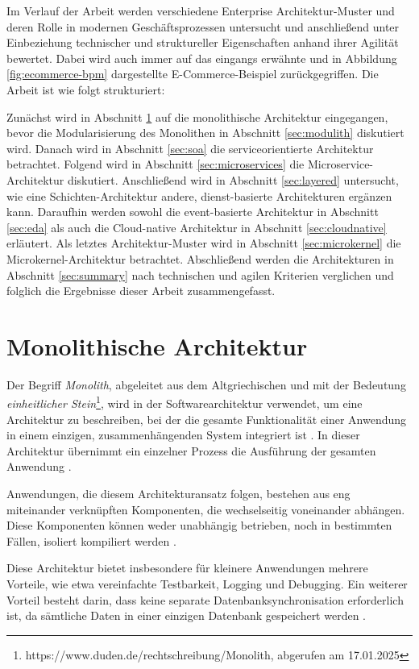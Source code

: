 \documentclass[acmtog]{acmart}
\begin{document}
Im Verlauf der Arbeit werden verschiedene Enterprise Architektur-Muster und deren Rolle in modernen Geschäftsprozessen untersucht
und anschließend unter Einbeziehung technischer und struktureller Eigenschaften anhand ihrer Agilität bewertet.
Dabei wird auch immer auf das eingangs erwähnte und in Abbildung \ref{fig:ecommerce-bpm} dargestellte E-Commerce-Beispiel zurückgegriffen.
Die Arbeit ist wie folgt strukturiert:

Zunächst wird in Abschnitt \ref{sec:monolith} auf die monolithische Architektur eingegangen, bevor die Modularisierung des Monolithen in Abschnitt \ref{sec:modulith} diskutiert wird.
Danach wird in Abschnitt \ref{sec:soa} die serviceorientierte Architektur betrachtet.
Folgend wird in Abschnitt \ref{sec:microservices} die Microservice-Architektur diskutiert.
Anschließend wird in Abschnitt \ref{sec:layered} untersucht, wie eine Schichten-Architektur andere, dienst-basierte Architekturen ergänzen kann.
Daraufhin werden sowohl die event-basierte Architektur in Abschnitt \ref{sec:eda} als auch die Cloud-native Architektur in Abschnitt \ref{sec:cloudnative} erläutert.
Als letztes Architektur-Muster wird in Abschnitt \ref{sec:microkernel} die Microkernel-Architektur betrachtet.
Abschließend werden die Architekturen in Abschnitt \ref{sec:summary} nach technischen und agilen Kriterien verglichen und folglich die Ergebnisse dieser Arbeit zusammengefasst.

\section{Monolithische Architektur}
\label{sec:monolith}
Der Begriff \textit{Monolith}, abgeleitet aus dem Altgriechischen und mit der Bedeutung
\textit{einheitlicher Stein}\footnote{https://www.duden.de/rechtschreibung/Monolith, abgerufen am 17.01.2025},
wird in der Softwarearchitektur verwendet, um eine Architektur zu beschreiben, bei der die gesamte Funktionalität
einer Anwendung in einem einzigen, zusammenhängenden System integriert ist \cite[1]{mono}.
In dieser Architektur übernimmt ein einzelner Prozess die Ausführung der gesamten Anwendung \cite{mono4}.

Anwendungen, die diesem Architekturansatz folgen, bestehen aus eng miteinander verknüpften
Komponenten, die wechselseitig voneinander abhängen.
Diese Komponenten können weder unabhängig betrieben, noch in bestimmten Fällen,
isoliert kompiliert werden \cite[485]{mono3}.

Diese Architektur bietet insbesondere für kleinere Anwendungen mehrere Vorteile,
wie etwa vereinfachte Testbarkeit, Logging und Debugging. Ein
weiterer Vorteil besteht darin, dass keine separate Datenbanksynchronisation
erforderlich ist, da sämtliche Daten in einer einzigen Datenbank gespeichert
werden \cite{mono4}.
\end{document}
